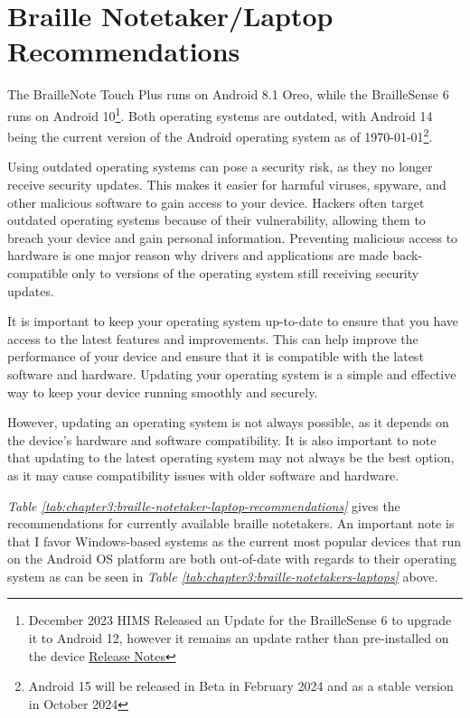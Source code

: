 \section{Braille Notetaker/Laptop Recommendations}\label{braille-notetakers-and-braille-laptop-computers-recommend}
The BrailleNote Touch Plus runs on Android 8.1 Oreo, while the BrailleSense 6 runs on Android 10\footnote{December 2023 HIMS Released an Update for the BrailleSense 6 to upgrade it to Android 12, however it remains an update rather than pre-installed on the device \href{https://hims-inc.com/wp-content/uploads/2023/11/Release-Note-for-BrailleSense-6-V2.0.docx}{Release Notes}}. Both operating systems are outdated, with Android 14 being the current version of the Android operating system as of \today\footnote{Android 15 will be released in Beta in February 2024 and as a stable version in October 2024}.

Using outdated operating systems can pose a security risk, as they no longer receive security updates. This makes it easier for harmful viruses, spyware, and other malicious software to gain access to your device. Hackers often target outdated operating systems because of their vulnerability, allowing them to breach your device and gain personal information. Preventing malicious access to hardware is one major reason why drivers and applications are made back-compatible only to versions of the operating system still receiving security updates.

It is important to keep your operating system up-to-date to ensure that you have access to the latest features and improvements. This can help improve the performance of your device and ensure that it is compatible with the latest software and hardware. Updating your operating system is a simple and effective way to keep your device running smoothly and securely.

However, updating an operating system is not always possible, as it depends on the device's hardware and software compatibility. It is also important to note that updating to the latest operating system may not always be the best option, as it may cause compatibility issues with older software and hardware.

\emph{Table \ref{tab:chapter3:braille-notetaker-laptop-recommendations}} gives the recommendations for currently available braille notetakers. An important note is that I favor Windows-based systems as the current most popular devices that run on the Android OS platform are both out-of-date with regards to their operating system as can be seen in \emph{Table \ref{tab:chapter3:braille-notetakers-laptops}} above.

